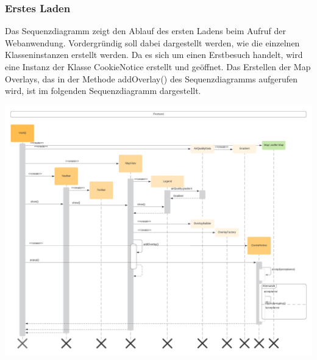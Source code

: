 \subsubsection{Erstes Laden}
\label{Erstes Laden}
Das Sequenzdiagramm zeigt den Ablauf des ersten Ladens beim Aufruf der Webanwendung. Vordergründig soll dabei dargestellt werden, wie die einzelnen Klasseninstanzen erstellt werden. Da es sich um einen Erstbesuch handelt, wird eine Instanz der Klasse CookieNotice erstellt und geöffnet. Das Erstellen der Map Overlays, das in der Methode addOverlay() des Sequenzdiagramms aufgerufen wird, ist im folgenden Sequenzdiagramm dargestellt. 
\begin{center}
	\includegraphics[width=1.2\textwidth]{media/frontend/sequence-diagram/sequenceFirstLoad.png} 
\end{center}

